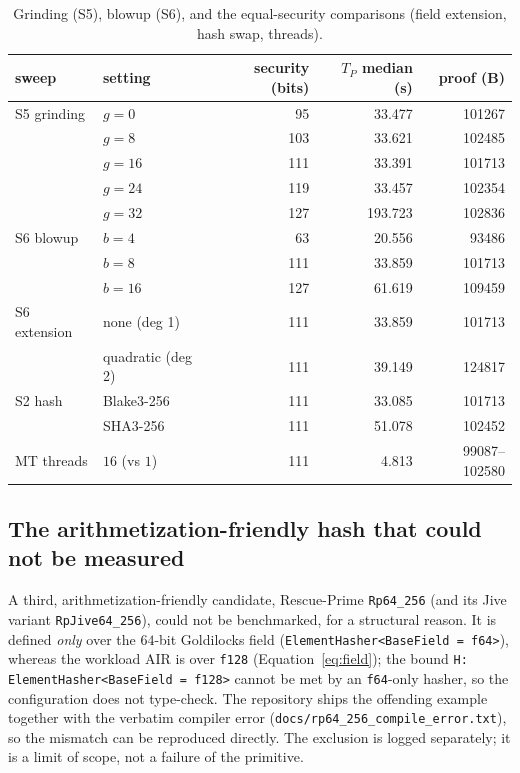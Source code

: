 \documentclass[11pt]{article}
\begin{document}
\begin{table}[htbp]\centering\footnotesize
\caption{Grinding (S5), blowup (S6), and the equal-security comparisons (field extension, hash swap,
threads).}
\label{tab:params}
\begin{tabular}{l l r r r}
\toprule
sweep & setting & security (bits) & $T_P$ median (s) & proof (B) \\
\midrule
S5 grinding & $g=0$   & 95  & 33.477  & \num{101267} \\
            & $g=8$   & 103 & 33.621  & \num{102485} \\
            & $g=16$  & 111 & 33.391  & \num{101713} \\
            & $g=24$  & 119 & 33.457  & \num{102354} \\
            & $g=32$  & 127 & 193.723 & \num{102836} \\
\midrule
S6 blowup & $b=4$   & 63  & 20.556  & \num{93486}  \\
          & $b=8$   & 111 & 33.859  & \num{101713} \\
          & $b=16$  & 127 & 61.619  & \num{109459} \\
\midrule
S6 extension & none (deg 1)      & 111 & 33.859 & \num{101713} \\
             & quadratic (deg 2) & 111 & 39.149 & \num{124817} \\
\midrule
S2 hash & Blake3-256 & 111 & 33.085 & \num{101713} \\
        & SHA3-256   & 111 & 51.078 & \num{102452} \\
\midrule
MT threads & $16$ (vs $1$) & 111 & 4.813 & \num{99087}--\num{102580} \\
\bottomrule
\end{tabular}
\end{table}

\subsection{The arithmetization-friendly hash that could not be measured}
\label{sec:nothash}

A third, arithmetization-friendly candidate, Rescue-Prime \texttt{Rp64\_256} (and its Jive variant
\texttt{RpJive64\_256}), could not be benchmarked, for a structural reason. It is defined \emph{only}
over the $64$-bit Goldilocks field (\texttt{ElementHasher<BaseField = f64>}), whereas the workload AIR
is over \texttt{f128} (Equation~\eqref{eq:field}); the bound \texttt{H: ElementHasher<BaseField = f128>}
cannot be met by an \texttt{f64}-only hasher, so the configuration does not type-check. The repository
ships the offending example together with the verbatim compiler error
(\texttt{docs/rp64\_256\_compile\_error.txt}), so the mismatch can be reproduced directly. The exclusion
is logged separately; it is a limit of scope, not a failure of the primitive.
\end{document}
